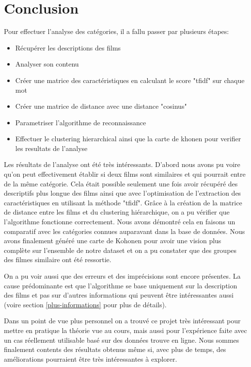 \chapter{Conclusion}
Pour effectuer l'analyse des catégories, il a fallu passer par plusieurs étapes:
\begin{itemize}
\item Récupérer les descriptions des films
\item Analyser son contenu
\item Créer une matrice des caractéristiques en calculant le score "tfidf" sur chaque mot
\item Créer une matrice de distance avec une distance "cosinus"
\item Parametriser l'algorithme de reconnaissance
\item Effectuer le clustering hierarchical ainsi que la carte de khonen pour verifier les resultats de l'analyse\\
\end{itemize}
 Les résultats de l'analyse ont été très intéressants. D'abord nous avons pu voire qu’on peut effectivement établir si deux films sont similaires et qui pourrait entre de la même catégorie. Cela était possible seulement une fois avoir récupéré des descriptifs plus longue des films ainsi que avec l'optimisation de l'extraction des caractéristiques en utilisant la méthode "tfidf". Grâce à la création de la matrice de distance entre les films et du clustering hiérarchique, on a pu vérifier que l'algorithme fonctionne correctement. Nous avons démontré cela en faisons un comparatif avec les catégories connues auparavant dans la base de données. Nous avons finalement généré une carte de Kohonen pour avoir une vision plus complète sur l'ensemble de notre dataset et on a pu constater que des groupes des filmes similaire ont été ressortie. 
 
 On a pu voir aussi  que des erreurs et des imprécisions sont encore présentes. La cause prédominante est que l'algorithme se base uniquement sur la description des films et pas sur d'autres informations qui peuvent être intéressantes aussi (voire section \ref{plus-informations} pour plus de détails). 
 
 Dans un point de vue plus personnel on a trouvé ce projet très intéressant pour mettre en pratique la théorie vue au cours, mais aussi pour l'expérience faite avec un cas réellement utilisable basé sur des données trouve en ligne. Nous sommes finalement contents des résultats obtenus même si, avec plus de temps, des améliorations pourraient être très intéressantes à explorer.
